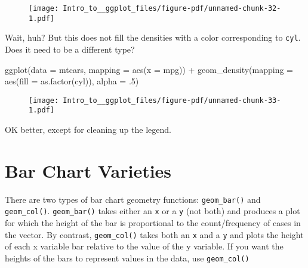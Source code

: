 \documentclass[
  letterpaper,
  DIV=11,
  numbers=noendperiod]{scrartcl}
\newenvironment{Shaded}{\begin{snugshade}}{\end{snugshade}}
\newcommand{\AttributeTok}[1]{\textcolor[rgb]{0.40,0.45,0.13}{#1}}
\newcommand{\DecValTok}[1]{\textcolor[rgb]{0.68,0.00,0.00}{#1}}
\newcommand{\FunctionTok}[1]{\textcolor[rgb]{0.28,0.35,0.67}{#1}}
\newcommand{\NormalTok}[1]{\textcolor[rgb]{0.00,0.23,0.31}{#1}}
\newcommand{\SpecialCharTok}[1]{\textcolor[rgb]{0.37,0.37,0.37}{#1}}
\begin{document}
\begin{figure}[H]

{\centering \texttt{[image: Intro\_to\_\_ggplot\_files/figure-pdf/unnamed-chunk-32-1.pdf]}

}

\end{figure}

Wait, huh? But this does not fill the densities with a color
corresponding to \texttt{cyl}. Does it need to be a different type?

\begin{Shaded}
\begin{Highlighting}[]
\FunctionTok{ggplot}\NormalTok{(}\AttributeTok{data =}\NormalTok{ mtcars, }
       \AttributeTok{mapping =} \FunctionTok{aes}\NormalTok{(}\AttributeTok{x =}\NormalTok{ mpg)) }\SpecialCharTok{+}
  \FunctionTok{geom\_density}\NormalTok{(}\AttributeTok{mapping =} \FunctionTok{aes}\NormalTok{(}\AttributeTok{fill =} \FunctionTok{as.factor}\NormalTok{(cyl)),}
               \AttributeTok{alpha =}\NormalTok{ .}\DecValTok{5}\NormalTok{)}
\end{Highlighting}
\end{Shaded}

\begin{figure}[H]

{\centering \texttt{[image: Intro\_to\_\_ggplot\_files/figure-pdf/unnamed-chunk-33-1.pdf]}

}

\end{figure}

OK better, except for cleaning up the legend.

\hypertarget{bar-chart-varieties}{%
\section{\texorpdfstring{\textbf{Bar Chart
Varieties}}{Bar Chart Varieties}}\label{bar-chart-varieties}}

There are two types of bar chart geometry functions:
\texttt{geom\_bar()} and \texttt{geom\_col()}. \texttt{geom\_bar()}
takes either an \texttt{x} or a \texttt{y} (not both) and produces a
plot for which the height of the bar is proportional to the
count/frequency of cases in the vector. By contrast,
\texttt{geom\_col()} takes both an \texttt{x} and a \texttt{y} and plots
the height of each x variable bar relative to the value of the y
variable. If you want the heights of the bars to represent values in the
data, use \texttt{geom\_col()}
\end{document}
